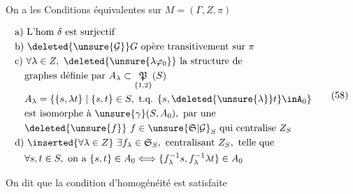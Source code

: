 On a les Conditions équivalentes sur $M=(\Gamma,Z,\pi)$

\[
\begin{aligned}
&\text{a) L'hom }\delta\text{ est surjectif}\\
&\text{b) }\deleted{\unsure{\mathcal G}}G\text{ opère transitivement sur }\pi\\
&\text{c) }\forall\lambda\in Z,\ \deleted{\unsure{\lambda\varphi_0}}\ \text{la structure de}\\
&\quad\text{graphes définie par } A_\lambda\subset\underset{\{1,2\}}{\mathfrak P}(S)\\
&\quad A_\lambda=\{\{s,\lambda t\}\mid\{s,t\}\in S,\ \text{t.q. }\{s,\deleted{\unsure{\lambda}}t\}\inA_0\}\\
&\quad\text{est isomorphe à }\unsure{\gamma}(S,A_0),\ \text{par une}\\
&\quad\deleted{\unsure{f}}\ f\in\unsure{\mathfrak S|\mathcal G}_S\text{ qui centralise }Z_S\\
&\text{d) }\inserted{\forall\lambda\in Z}\ \exists f_\lambda\in\mathfrak S_S,\ \text{centralisant }Z_S,\ \text{telle que}\\
&\quad\forall s,t\in S,\ \text{on a }\{s,t\}\in A_0\Longleftrightarrow\{f_\lambda^{-1}s,f_\lambda^{-1}\lambda t\}\in A_0
\end{aligned}
\tag*{(58)}
\]


On dit que la condition d'homogénéité est satisfaite

